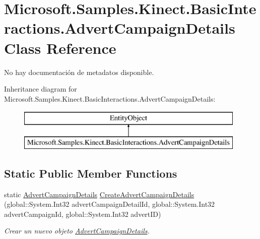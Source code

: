 \hypertarget{class_microsoft_1_1_samples_1_1_kinect_1_1_basic_interactions_1_1_advert_campaign_details}{\section{Microsoft.\-Samples.\-Kinect.\-Basic\-Interactions.\-Advert\-Campaign\-Details Class Reference}
\label{class_microsoft_1_1_samples_1_1_kinect_1_1_basic_interactions_1_1_advert_campaign_details}
}


No hay documentación de metadatos disponible.  


Inheritance diagram for Microsoft.\-Samples.\-Kinect.\-Basic\-Interactions.\-Advert\-Campaign\-Details\-:\begin{figure}[H]
\begin{center}
\leavevmode
\includegraphics[height=2.000000cm]{class_microsoft_1_1_samples_1_1_kinect_1_1_basic_interactions_1_1_advert_campaign_details}
\end{center}
\end{figure}
\subsection*{Static Public Member Functions}
\begin{DoxyCompactItemize}
\item 
static \hyperlink{class_microsoft_1_1_samples_1_1_kinect_1_1_basic_interactions_1_1_advert_campaign_details}{Advert\-Campaign\-Details} \hyperlink{class_microsoft_1_1_samples_1_1_kinect_1_1_basic_interactions_1_1_advert_campaign_details_aa3cc60d6b631775304c4f07ee2362146}{Create\-Advert\-Campaign\-Details} (global\-::\-System.\-Int32 advert\-Campaign\-Detail\-Id, global\-::\-System.\-Int32 advert\-Campaign\-Id, global\-::\-System.\-Int32 advert\-I\-D)
\begin{DoxyCompactList}\small\item\em Crear un nuevo objeto \hyperlink{class_microsoft_1_1_samples_1_1_kinect_1_1_basic_interactions_1_1_advert_campaign_details}{Advert\-Campaign\-Details}. \end{DoxyCompactList}\end{DoxyCompactItemize}
